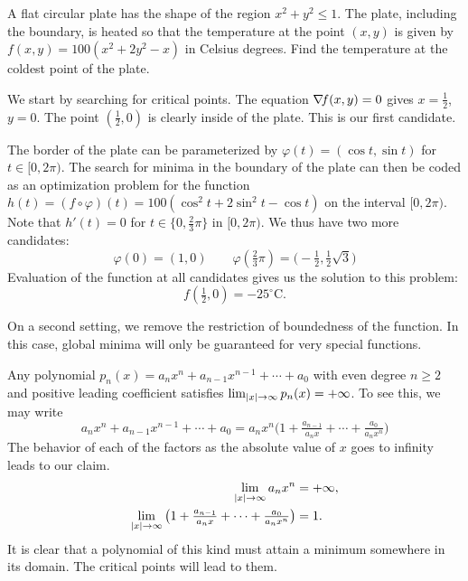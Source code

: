 \begin{example}
A flat circular plate has the shape of the region $x^2+y^2 \leq 1$. The plate, including the boundary, is heated so that the temperature at the point $(x,y)$ is given by $f(x,y) =100(x^2 +2 y^2 - x)$ in Celsius degrees.  Find the temperature at the coldest point of the plate.

We start by searching for critical points.  The equation $\mathop{\nabla\! {f}}(x,y) = 0$ gives $x=\tfrac{1}{2}$, $y=0$. The point $(\tfrac{1}{2}, 0)$ is clearly inside of the plate.  This is our first candidate.

The border of the plate can be parameterized by $\varphi(t) = (\cos t, \sin t)$ for $t \in [0,2\pi)$.  The search for minima in the boundary of the plate can then be coded as an optimization problem for the function $h(t) = (f \circ \varphi) (t) = 100(\cos^2 t + 2\sin^2 t - \cos t)$ on the interval $[0,2\pi)$.  Note that $h'(t) = 0$ for $t \in \{ 0, \tfrac{2}{3}\pi \}$ in $[0,2\pi)$.  We thus have two more candidates: 
\begin{equation*}
\varphi(0) = (1,0) \qquad \varphi(\tfrac{2}{3}\pi)= \big( -\tfrac{1}{2}, \tfrac{1}{2}\sqrt{3} \big)
\end{equation*}
Evaluation of the function at all candidates gives us the solution to this problem: 
\begin{equation*}
f( \tfrac{1}{2}, 0 ) = -25^\circ\mathrm{C}.
\end{equation*}
\end{example}

On a second setting, we remove the restriction of boundedness of the function.  In this case, global minima will only be guaranteed for very special functions.

\begin{example}\label{example:CoerciveFunctions}
Any polynomial $p_n(x) = a_n x^n + a_{n-1} x^{n-1} + \dotsb + a_0$ with even degree $n \geq 2$ and positive leading coefficient satisfies 
$\lim_{\lvert x \rvert\to \infty} p_n(x) = +\infty$.  
To see this, we may write
\begin{equation*}
a_n x^n + a_{n-1} x^{n-1} + \dotsb + a_0 = a_n x^n \big( 1 + \tfrac{a_{n-1}}{a_n x} + \dotsb + \tfrac{a_0}{a_n x^n} \big)
\end{equation*}
The behavior of each of the factors as the absolute value of $x$ goes to infinity leads to our claim.
\begin{align*}
\lim_{\lvert x \rvert \to \infty} a_n x^n &= +\infty, \\
\lim_{\lvert x \rvert \to \infty} \big( 1 + \tfrac{a_{n-1}}{a_n x} + \dotsb + \tfrac{a_0}{a_n x^n} \big) &= 1.
\end{align*}
It is clear that a polynomial of this kind must attain a minimum somewhere in its domain. The critical points will lead to them.
\end{example}

